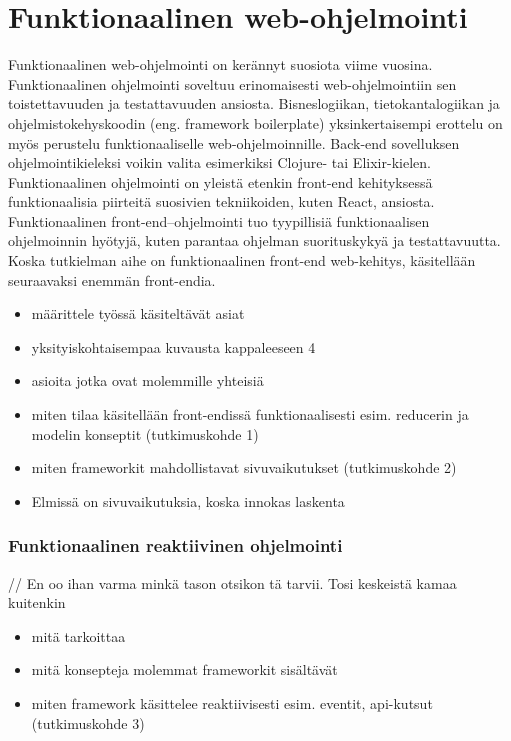 \section{Funktionaalinen web-ohjelmointi}
Funktionaalinen web-ohjelmointi on kerännyt suosiota viime vuosina. Funktionaalinen ohjelmointi soveltuu erinomaisesti
web-ohjelmointiin sen toistettavuuden ja testattavuuden ansiosta. Bisneslogiikan, tietokantalogiikan ja
ohjelmistokehyskoodin (eng. framework boilerplate) yksinkertaisempi erottelu on myös perustelu funktionaaliselle
web-ohjelmoinnille. Back-end sovelluksen ohjelmointikieleksi voikin valita esimerkiksi Clojure- tai Elixir-kielen.
\cite{functionalwebdev} Funktionaalinen ohjelmointi on yleistä etenkin front-end kehityksessä funktionaalisia piirteitä
suosivien tekniikoiden, kuten React, ansiosta. Funktionaalinen front-end–ohjelmointi tuo tyypillisiä funktionaalisen
ohjelmoinnin hyötyjä, kuten parantaa ohjelman suorituskykyä ja testattavuutta. \cite{functionalreact} Koska tutkielman
aihe on funktionaalinen front-end web-kehitys, käsitellään seuraavaksi enemmän front-endia.

\begin{itemize}
  \item määrittele työssä käsiteltävät asiat
  \item yksityiskohtaisempaa kuvausta kappaleeseen 4
  \item asioita jotka ovat molemmille yhteisiä
  \item miten tilaa käsitellään front-endissä funktionaalisesti esim. reducerin ja modelin konseptit (tutkimuskohde 1)
  \item miten frameworkit mahdollistavat sivuvaikutukset (tutkimuskohde 2)
  \item Elmissä on sivuvaikutuksia, koska innokas laskenta
\end{itemize}

\subsubsection{Funktionaalinen reaktiivinen ohjelmointi}

// En oo ihan varma minkä tason otsikon tä tarvii. Tosi keskeistä kamaa kuitenkin

\begin{itemize}
  \item mitä tarkoittaa
  \item mitä konsepteja molemmat frameworkit sisältävät
  \item miten framework käsittelee reaktiivisesti esim. eventit, api-kutsut (tutkimuskohde 3)
\end{itemize}
